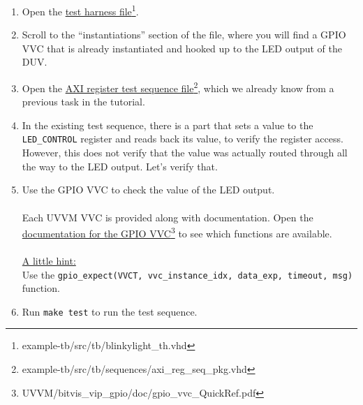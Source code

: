 \begin{enumerate}
      \item Open the \href{../../example-tb/src/tb/blinkylight\_th.vhd} {test harness file}\footnote{example-tb/src/tb/blinkylight\_th.vhd}.
      \item Scroll to the ``instantiations'' section of the file, where you will find a GPIO VVC that is already instantiated and hooked up to the LED output of the DUV.
      \item Open the \href{../../example-tb/src/tb/sequences/axi\_reg\_seq\_pkg.vhd} {AXI register test sequence file}\footnote{example-tb/src/tb/sequences/axi\_reg\_seq\_pkg.vhd}, which we already know from a previous task in the tutorial.
      \item In the existing test sequence, there is a part that sets a value to the \texttt{LED\_CONTROL} register and reads back its value, to verify the register access. However, this does not verify that the value was actually routed through all the way to the LED output. Let's verify that.
      \item Use the GPIO VVC to check the value of the LED output.\\
            \\
            Each UVVM VVC is provided along with documentation. Open the \href{../../UVVM/bitvis\_vip\_gpio/doc/gpio\_vvc\_QuickRef.pdf} {documentation for the GPIO VVC}\footnote{UVVM/bitvis\_vip\_gpio/doc/gpio\_vvc\_QuickRef.pdf} to see which functions are available.\\
            \\
            \underline{A little hint:}\\
            Use the \texttt{gpio\_expect(VVCT, vvc\_instance\_idx, data\_exp, timeout, msg)} function.
      \item Run \texttt{make test} to run the test sequence.

\end{enumerate}
